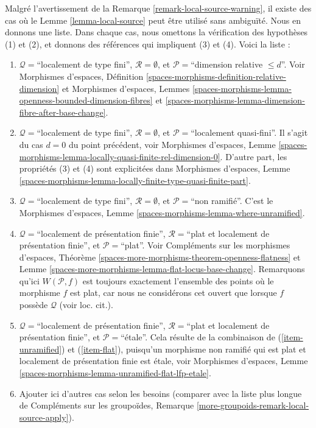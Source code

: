 \begin{remark}
\label{remark-local-source-apply}
Malgré l'avertissement de la
Remarque \ref{remark-local-source-warning},
il existe des cas où le
Lemme \ref{lemma-local-source}
peut être utilisé sans ambiguïté.
Nous en donnons une liste. Dans chaque cas, nous omettons la vérification des
hypothèses (1) et (2), et donnons des références qui impliquent
(3) et (4). Voici la liste :
\begin{enumerate}
\item
\label{item-rel-dim-leq-d}
$\mathcal{Q} = $``localement de type fini'', $\mathcal{R} = \emptyset$,
et $\mathcal{P} =$``dimension relative $\leq d$''.
Voir
Morphismes d'espaces,
Définition \ref{spaces-morphisms-definition-relative-dimension}
et
Morphismes d'espaces, Lemmes
\ref{spaces-morphisms-lemma-openness-bounded-dimension-fibres} et
\ref{spaces-morphisms-lemma-dimension-fibre-after-base-change}.
\item
\label{item-loc-quasi-finite}
$\mathcal{Q} =$``localement de type fini'', $\mathcal{R} = \emptyset$,
et $\mathcal{P} =$``localement quasi-fini''.
Il s'agit du cas $d = 0$ du point précédent, voir
Morphismes d'espaces, Lemme
\ref{spaces-morphisms-lemma-locally-quasi-finite-rel-dimension-0}.
D'autre part, les propriétés (3) et (4) sont explicitées dans
Morphismes d'espaces, Lemme
\ref{spaces-morphisms-lemma-locally-finite-type-quasi-finite-part}.
\item
\label{item-unramified}
$\mathcal{Q} = $``localement de type fini'', $\mathcal{R} = \emptyset$,
et $\mathcal{P} =$``non ramifié''. C'est le
Morphismes d'espaces, Lemme \ref{spaces-morphisms-lemma-where-unramified}.
\item
\label{item-flat}
$\mathcal{Q} =$``localement de présentation finie'',
$\mathcal{R} =$``plat et localement de présentation finie'', et
$\mathcal{P} =$``plat''. Voir
Compléments sur les morphismes d'espaces, Théorème
\ref{spaces-more-morphisms-theorem-openness-flatness} et
Lemme \ref{spaces-more-morphisms-lemma-flat-locus-base-change}.
Remarquons qu'ici $W(\mathcal{P}, f)$ est toujours exactement l'ensemble des points
où le morphisme $f$ est plat, car nous ne considérons cet ouvert que
lorsque $f$ possède $\mathcal{Q}$ (voir loc. cit.).
\item
\label{item-etale}
$\mathcal{Q} =$``localement de présentation finie'',
$\mathcal{R} =$``plat et localement de présentation finie'', et
$\mathcal{P}=$``\'etale''. Cela résulte de la combinaison de
(\ref{item-unramified}) et (\ref{item-flat}), puisqu'un morphisme non ramifié
qui est plat et localement de présentation finie est \'etale, voir
Morphismes d'espaces,
Lemme \ref{spaces-morphisms-lemma-unramified-flat-lfp-etale}.
\item Ajouter ici d'autres cas selon les besoins (comparer avec la liste plus longue de
Compléments sur les groupoïdes, Remarque \ref{more-groupoids-remark-local-source-apply}).
\end{enumerate}
\end{remark}












